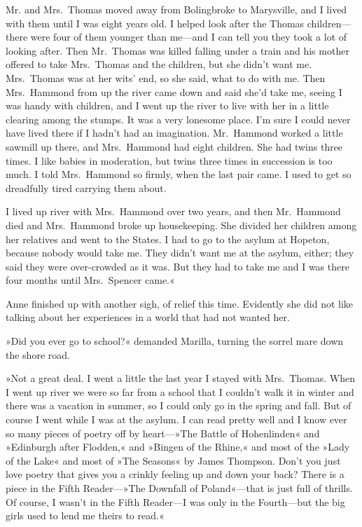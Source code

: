 Mr. and Mrs.~Thomas moved away from Bolingbroke to Marysville, and I lived with them until I was eight years old. I helped look after the Thomas children—there were four of them younger than me—and I can tell you they took a lot of looking after. Then Mr.~Thomas was killed falling under a train and his mother offered to take Mrs.~Thomas and the children, but she didn't want me. Mrs.~Thomas was at her wits' end, so she said, what to do with me. Then Mrs.~Hammond from up the river came down and said she'd take me, seeing I was handy with children, and I went up the river to live with her in a little clearing among the stumps. It was a very lonesome place. I'm sure I could never have lived there if I hadn't had an imagination. Mr.~Hammond worked a little sawmill up there, and Mrs.~Hammond had eight children. She had twins three times. I like babies in moderation, but twins three times in succession is too much. I told Mrs.~Hammond so firmly, when the last pair came. I used to get so dreadfully tired carrying them about.

I lived up river with Mrs.~Hammond over two years, and then Mr.~Hammond died and Mrs.~Hammond broke up housekeeping. She divided her children among her relatives and went to the States. I had to go to the asylum at Hopeton, because nobody would take me. They didn't want me at the asylum, either; they said they were over-crowded as it was. But they had to take me and I was there four months until Mrs.~Spencer came.«

Anne finished up with another sigh, of relief this time. Evidently she did not like talking about her experiences in a world that had not wanted her.

»Did you ever go to school?« demanded Marilla, turning the sorrel mare down the shore road.

»Not a great deal. I went a little the last year I stayed with Mrs.~Thomas. When I went up river we were so far from a school that I couldn't walk it in winter and there was a vacation in summer, so I could only go in the spring and fall. But of course I went while I was at the asylum. I can read pretty well and I know ever so many pieces of poetry off by heart—»The Battle of Hohenlinden« and »Edinburgh after Flodden,« and »Bingen of the Rhine,« and most of the »Lady of the Lake« and most of »The Seasons« by James Thompson. Don't you just love poetry that gives you a crinkly feeling up and down your back? There is a piece in the Fifth Reader—»The Downfall of Poland«—that is just full of thrills. Of course, I wasn't in the Fifth Reader—I was only in the Fourth—but the big girls used to lend me theirs to read.«

